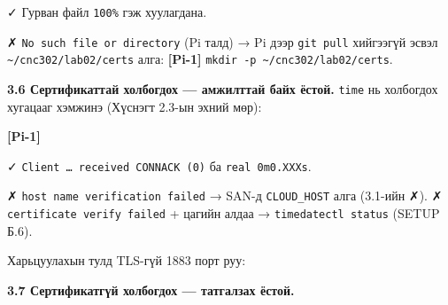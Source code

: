 ✓ Гурван файл \texttt{100\%} гэж хуулагдана.

✗ \texttt{No\ such\ file\ or\ directory} (Pi талд) → Pi дээр \texttt{git\ pull} хийгээгүй эсвэл \texttt{\textasciitilde{}/cnc302/lab02/certs} алга: \textbf{{[}Pi-1{]}} \texttt{mkdir\ -p\ \textasciitilde{}/cnc302/lab02/certs}.

\textbf{3.6 Сертификаттай холбогдох --- амжилттай байх ёстой.} \texttt{time} нь холбогдох хугацааг хэмжинэ (Хүснэгт 2.3-ын эхний мөр):

\textbf{{[}Pi-1{]}}

\begin{Shaded}
\begin{Highlighting}[]
\KeywordTok{\textbackslash{}}
  \KeywordTok{\textbackslash{}}
   
\end{Highlighting}
\end{Shaded}

✓ \texttt{Client\ \ldots{}\ received\ CONNACK\ (0)} ба \texttt{real\ 0m0.XXXs}.

✗ \texttt{host\ name\ verification\ failed} → SAN-д \texttt{CLOUD\_HOST} алга (3.1-ийн ✗). ✗ \texttt{certificate\ verify\ failed} + цагийн алдаа → \texttt{timedatectl\ status} (SETUP Б.6).

Харьцуулахын тулд TLS-гүй 1883 порт руу:

\begin{Shaded}
\begin{Highlighting}[]
\end{Highlighting}
\end{Shaded}

\textbf{3.7 Сертификатгүй холбогдох --- татгалзах ёстой.}

\begin{Shaded}
\begin{Highlighting}[]
\KeywordTok{\textbackslash{}}
   
\end{Highlighting}
\end{Shaded}

